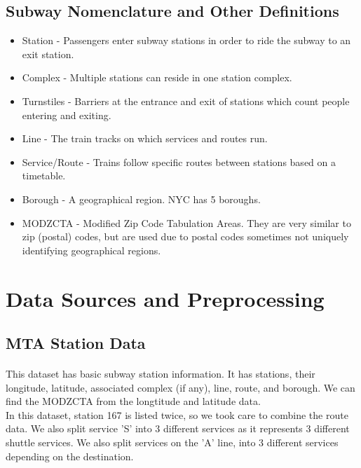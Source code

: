 \documentclass[12pt, a4, epsf] {article}
\theoremstyle{plain}
\theoremstyle{definition}
\begin{document}
\subsection{Subway Nomenclature and Other Definitions}
\begin{itemize}
    \item {Station} - Passengers enter subway stations in order to ride the subway to an exit station.
    \item {Complex} - Multiple stations can reside in one station complex.
    \item {Turnstiles} - Barriers at the entrance and exit of stations which count people entering and exiting. 
    \item {Line} - The train tracks on which services and routes run.
    \item {Service/Route} - Trains follow specific routes between stations based on a timetable. 
    \item {Borough} - A geographical region. NYC has 5 boroughs. 
    \item {MODZCTA} - Modified Zip Code Tabulation Areas. They are very similar to zip (postal) codes, but are used due to postal codes sometimes not uniquely identifying geographical regions.
\end{itemize}
\section{Data Sources and Preprocessing}
\subsection{MTA Station Data \cite{mta_stations}}
\paragraph{}
This dataset has basic subway station information. It has stations, their longitude, latitude, associated complex (if any), line, route, and borough. We can find the MODZCTA from the longtitude and latitude data.\\
In this dataset, station 167 is listed twice, so we took care to combine the route data. We also split service 'S' into 3 different services as it represents 3 different shuttle services. We also split services on the 'A' line, into 3 different services depending on the destination. 
\end{document}
